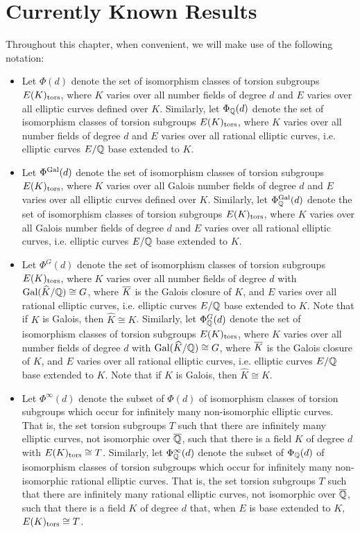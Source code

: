 \chapter{Currently Known Results\label{ch:known}}

Throughout this chapter, when convenient, we will make use of the following notation:


\begin{itemize}
\item Let $\Phi(d)$ denote the set of isomorphism classes of torsion subgroups $E(K)_{\text{tors}}$, where $K$ varies over all number fields of degree $d$ and $E$ varies over all elliptic curves defined over $K$. Similarly, let $\Phi_{\mathbb{Q}}(d)$ denote the set of isomorphism classes of torsion subgroups $E(K)_{\text{tors}}$, where $K$ varies over all number fields of degree $d$ and $E$ varies over all rational elliptic curves, i.e. elliptic curves $E/\mathbb{Q}$ base extended to $K$.

\item Let $\Phi^{\operatorname{Gal}}(d)$ denote the set of isomorphism classes of torsion subgroups $E(K)_{\text{tors}}$, where $K$ varies over all Galois number fields of degree $d$ and $E$ varies over all elliptic curves defined over $K$. Similarly, let $\Phi_{\mathbb{Q}}^{\operatorname{Gal}}(d)$ denote the set of isomorphism classes of torsion subgroups $E(K)_{\text{tors}}$, where $K$ varies over all Galois number fields of degree $d$ and $E$ varies over all rational elliptic curves, i.e. elliptic curves $E/\mathbb{Q}$ base extended to $K$.

\item Let $\Phi^{G}(d)$ denote the set of isomorphism classes of torsion subgroups $E(K)_{\text{tors}}$, where $K$ varies over all number fields of degree $d$ with $\operatorname{Gal}(\widehat{K}/\mathbb{Q}) \cong G$, where $\overline{K}$ is the Galois closure of $K$, and $E$ varies over all rational elliptic curves, i.e. elliptic curves $E/\mathbb{Q}$ base extended to $K$. Note that if $K$ is Galois, then $\widehat{K} \cong K$. Similarly, let $\Phi_{\mathbb{Q}}^{G}(d)$ denote the set of isomorphism classes of torsion subgroups $E(K)_{\text{tors}}$, where $K$ varies over all number fields of degree $d$ with $\operatorname{Gal}(\widehat{K}/\mathbb{Q}) \cong G$, where $\overline{K}$ is the Galois closure of $K$, and $E$ varies over all rational elliptic curves, i.e. elliptic curves $E/\mathbb{Q}$ base extended to $K$. Note that if $K$ is Galois, then $\widehat{K} \cong K$.

\item Let $\Phi^\infty(d)$ denote the subset of $\Phi(d)$ of isomorphism classes of torsion subgroups which occur for infinitely many non-isomorphic elliptic curves. That is, the set torsion subgroups $T$ such that there are infinitely many elliptic curves, not isomorphic over $\overline{\mathbb{Q}}$, such that there is a field $K$ of degree $d$ with $E(K)_{\text{tors}} \cong T$. Similarly, let $\Phi_{\mathbb{Q}}^\infty(d)$ denote the subset of $\Phi_{\mathbb{Q}}(d)$ of isomorphism classes of torsion subgroups which occur for infinitely many non-isomorphic rational elliptic curves. That is, the set torsion subgroups $T$ such that there are infinitely many rational elliptic curves, not isomorphic over $\overline{\mathbb{Q}}$, such that there is a field $K$ of degree $d$ that, when $E$ is base extended to $K$, $E(K)_{\text{tors}} \cong T$. 


\end{itemize}
